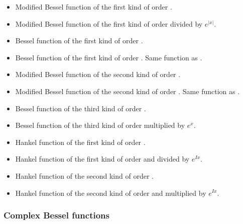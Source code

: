 \begin{itemize}
\item {}
  \sshortdescribe   Modified Bessel function of the first
  kind of order .
\item {}
  \sshortdescribe   Modified Bessel function of the first
  kind of order  divided by $e^{|x|}$.
\item {}
  \sshortdescribe    Bessel function of the first
  kind of order .
\item {}
  \sshortdescribe    Bessel function of the first
  kind of order . Same function as .
\item {}
  \sshortdescribe   Modified Bessel function of the second
  kind of order .
\item {}
  \sshortdescribe   Modified Bessel function of the second
  kind of order . Same function as .
\item {}
  \sshortdescribe   Bessel function of the third
  kind of order .
\item {}
  \sshortdescribe   Bessel function of the third
  kind of order  multiplied by $e^{x}$.
\item {}
  \sshortdescribe   Hankel function of the first kind of
  order . 
\item {}
  \sshortdescribe  Hankel function of the first kind of order
    and divided by $e^{I x}$.
\item {}
  \sshortdescribe  Hankel function of the second kind of
  order . 
\item {}
  \sshortdescribe  Hankel function of the second kind of
  order   and multiplied by $e^{I x}$.
\end{itemize}

\subsubsection{Complex Bessel functions}

